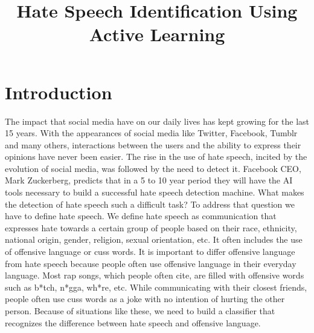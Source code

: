 \documentclass[10pt, a4paper]{article}
\title{Hate Speech Identification Using Active Learning}
\begin{document}
	
	\maketitleabstract
	
	\section{Introduction}
	\begin{table}[t!]
		\centering
		\caption{First row shows the original tweet post from the dataset, the second row shows cleaned, tokenized and stemmed tweet post}
		\label{tbl:prepData}
	\end{table}
	
	The impact that social media have on our daily lives has kept growing for the last 15 years. With the appearances of social media like Twitter, Facebook, Tumblr and many others, interactions between the users and the ability to express their opinions have never been easier. The rise in the use of hate speech, incited by the evolution of social media, was followed by the need to detect it. Facebook CEO, Mark Zuckerberg, predicts that in a 5 to 10 year period they will have the AI tools necessary to build a successful hate speech detection machine. What makes the detection of hate speech such a difficult task? To address that question we have to define hate speech. We define hate speech as communication that expresses hate towards a certain group of people based on their race, ethnicity, national origin, gender, religion, sexual orientation, etc. It often includes the use of offensive language or cuss words. It is important to differ offensive language from hate speech because people often use offensive language in their everyday language. Most rap songs, which people often cite, are filled with offensive words such as b*tch, n*gga, wh*re, etc. While communicating with their closest friends, people often use cuss words as a joke with no intention of hurting the other person. Because of situations like these, we need to build a classifier that recognizes the difference between hate speech and offensive language. 
	
\end{document}
